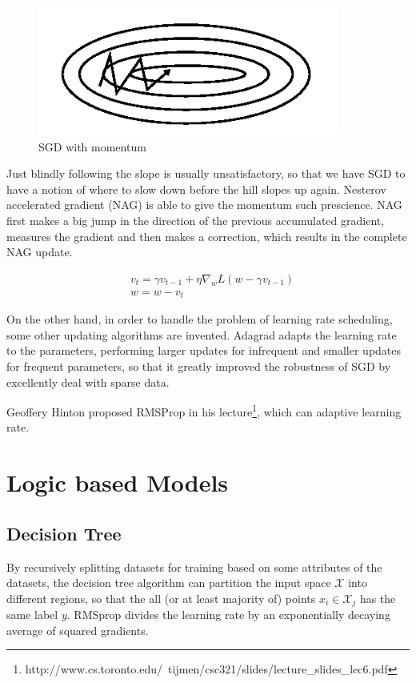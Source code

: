 \documentclass[10pt,twocolumn,letterpaper]{article}
\begin{document}
	\begin{figure}[h]
		\begin{center}
			\includegraphics[width=0.9\linewidth]{images/with.png}
			\caption{SGD with momentum}	
		\end{center}
	\end{figure}
	
	Just blindly following the slope is usually unsatisfactory\cite{ruder_2017}, so that we have SGD to have a notion of where to slow down before the hill slopes up again. Nesterov accelerated gradient (NAG)\cite{nesterov} is able to give the momentum such prescience. NAG first makes a big jump in the direction of the previous accumulated gradient, measures the gradient and then makes a correction, which results in the complete NAG update\cite{ruder_2017}. 
	
	\begin{align}
		&v_t = \gamma v_{t - 1} + \eta \nabla_w L(w - \gamma v_{t - 1})\nonumber\\
		&w = w - v_t\nonumber
	\end{align}
	
	On the other hand, in order to handle the problem of learning rate scheduling, some other updating algorithms are invented. Adagrad\cite{Duchi:2011:ASM:1953048.2021068} adapts the learning rate to the parameters, performing larger updates for infrequent and smaller updates for frequent parameters, so that it greatly improved the robustness of SGD\cite{NIPS2012_4687} by excellently deal with sparse data.
	
	Geoffery Hinton proposed RMSProp in his lecture\footnote{http://www.cs.toronto.edu/~tijmen/csc321/slides/lecture\_slides\_lec6.pdf}, which can adaptive learning rate.
		
\section{Logic based Models}

\subsection{Decision Tree}
		By recursively splitting datasets for training based on some attributes of the datasets, the decision tree algorithm can partition the input space $\mathcal{X}$ into different regions, so that the all (or at least majority of) points $x_i \in \mathcal{X}_j$ has the same label $y$. RMSprop divides the learning rate by an exponentially decaying average of squared gradients\cite{ruder_2017}.
		
\end{document}
